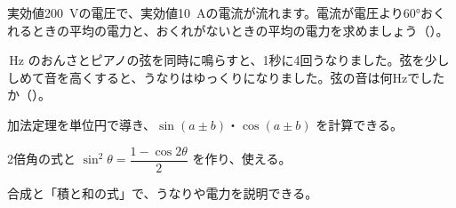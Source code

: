 \bkproblem 実効値\qty{200}{V}の電圧で、実効値\qty{10}{A}の電流が流れます。電流が電圧より60°おくれるときの平均の電力と、おくれがないときの平均の電力を求めましょう\mbox{（）}。

\,Hz のおんさとピアノの弦を同時に鳴らすと、1秒に4回うなりました。弦を少ししめて音を高くすると、うなりはゆっくりになりました。弦の音は何Hzでしたか\mbox{（）}。

\begin{furikaeri}
\begin{checklist}
\item 加法定理を単位円で導き、$\sin(a\pm b)$・$\cos(a\pm b)$ を計算できる。
\item 2倍角の式と $\sin^2\theta=\dfrac{1-\cos2\theta}{2}$ を作り、使える。
\item 合成と「積と和の式」で、うなりや電力を説明できる。
\end{checklist}
\end{furikaeri}

